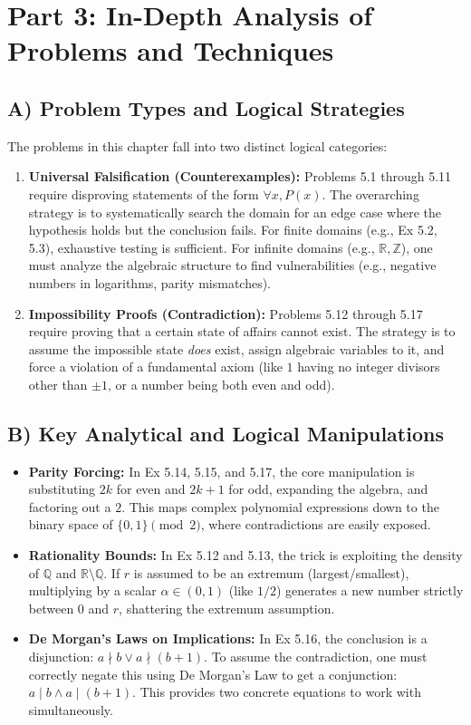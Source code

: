 \documentclass[11pt, letterpaper]{article}
\theoremstyle{remark}
\newcommand{\R}{\mathbb{R}}
\newcommand{\Z}{\mathbb{Z}}
\newcommand{\Q}{\mathbb{Q}}
\begin{document}
\newpage
\section{Part 3: In-Depth Analysis of Problems and Techniques}

\subsection{A) Problem Types and Logical Strategies}
The problems in this chapter fall into two distinct logical categories:
\begin{enumerate}
    \item \textbf{Universal Falsification (Counterexamples):} Problems 5.1 through 5.11 require disproving statements of the form $\forall x, P(x)$. The overarching strategy is to systematically search the domain for an edge case where the hypothesis holds but the conclusion fails. For finite domains (e.g., Ex 5.2, 5.3), exhaustive testing is sufficient. For infinite domains (e.g., $\R, \Z$), one must analyze the algebraic structure to find vulnerabilities (e.g., negative numbers in logarithms, parity mismatches).
    \item \textbf{Impossibility Proofs (Contradiction):} Problems 5.12 through 5.17 require proving that a certain state of affairs cannot exist. The strategy is to assume the impossible state \textit{does} exist, assign algebraic variables to it, and force a violation of a fundamental axiom (like $1$ having no integer divisors other than $\pm 1$, or a number being both even and odd).
\end{enumerate}

\subsection{B) Key Analytical and Logical Manipulations}
\begin{itemize}
    \item \textbf{Parity Forcing:} In Ex 5.14, 5.15, and 5.17, the core manipulation is substituting $2k$ for even and $2k+1$ for odd, expanding the algebra, and factoring out a $2$. This maps complex polynomial expressions down to the binary space of $\{0, 1\} \pmod 2$, where contradictions are easily exposed.
    \item \textbf{Rationality Bounds:} In Ex 5.12 and 5.13, the trick is exploiting the density of $\Q$ and $\R \setminus \Q$. If $r$ is assumed to be an extremum (largest/smallest), multiplying by a scalar $\alpha \in (0, 1)$ (like $1/2$) generates a new number strictly between $0$ and $r$, shattering the extremum assumption.
    \item \textbf{De Morgan's Laws on Implications:} In Ex 5.16, the conclusion is a disjunction: $a \nmid b \lor a \nmid (b+1)$. To assume the contradiction, one must correctly negate this using De Morgan's Law to get a conjunction: $a \mid b \land a \mid (b+1)$. This provides two concrete equations to work with simultaneously.
\end{itemize}
\end{document}
